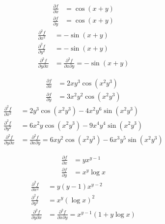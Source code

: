 

\begin{tanswer}
\begin{align*}
    \frac{\partial f}{\partial x} &= \cos(x+y) \\
    \frac{\partial f}{\partial y} &= \cos(x+y)
\end{align*}
\begin{align*}
    \frac{\partial^2 f}{\partial x^2} &= -\sin(x+y) \\
    \frac{\partial^2 f}{\partial y^2} &= -\sin(x+y) \\
    \frac{\partial^2 f}{\partial y \partial x} &= \frac{\partial^2 f}{\partial x \partial y} = -\sin(x+y)
\end{align*}
\end{tanswer}


\begin{tanswer}
\begin{align*}
    \frac{\partial f}{\partial x} &= 2xy^3\cos(x^2y^3) \\
    \frac{\partial f}{\partial y} &= 3x^2y^2\cos(x^2y^3)
\end{align*}
\begin{align*}
    \frac{\partial^2 f}{\partial x^2} &= 2y^3\cos(x^2y^3) - 4x^2y^6\sin(x^2y^3) \\
    \frac{\partial^2 f}{\partial y^2} &= 6x^2y\cos(x^2y^3) - 9x^4y^4\sin(x^2y^3) \\
    \frac{\partial^2 f}{\partial y \partial x} &= \frac{\partial^2 f}{\partial x \partial y} = 6xy^2\cos(x^2y^3) - 6x^3y^5\sin(x^2y^3)
\end{align*}
\end{tanswer}


\begin{tanswer}
\begin{align*}
    \frac{\partial f}{\partial x} &= yx^{y-1} \\
    \frac{\partial f}{\partial y} &= x^y \log  x
\end{align*}
\begin{align*}
    \frac{\partial^2 f}{\partial x^2} &= y(y-1)x^{y-2} \\
    \frac{\partial^2 f}{\partial y^2} &= x^y (\log x)^2 \\
    \frac{\partial^2 f}{\partial y \partial x} &= \frac{\partial^2 f}{\partial x \partial y} = x^{y-1}(1 + y\log x)
\end{align*}
\end{tanswer}

